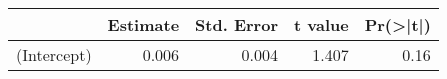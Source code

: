 
\begin{tabular}{l|r|r|r|r}
\hline
  & Estimate & Std. Error & t value & Pr(>|t|)\\
\hline
(Intercept) & 0.006 & 0.004 & 1.407 & 0.16\\
\hline
\end{tabular}

